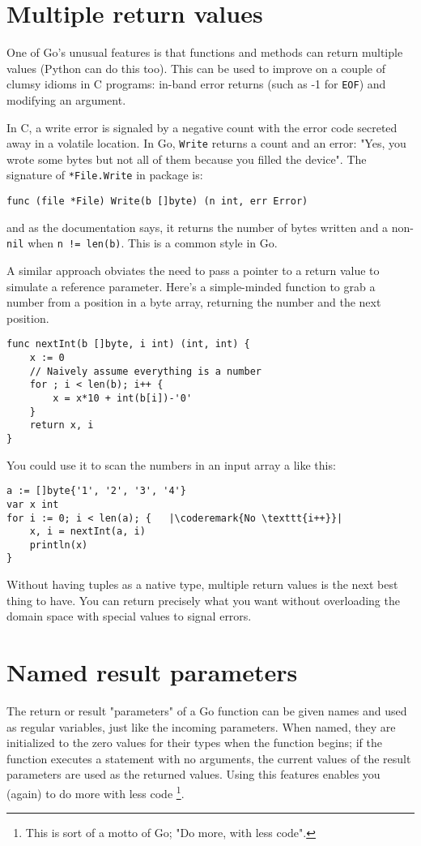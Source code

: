 

\section{Multiple return values}
\label{sec:multiple return}
One of Go's unusual features is that functions and methods can return multiple
values (Python can do this too). This can be used to improve on a couple of 
clumsy idioms in C programs:
in-band error returns (such as -1 for \texttt{EOF}) and modifying an argument.

In C, a write error is signaled by a negative count with the error code
secreted away in a volatile location. In Go, \lstinline{Write} returns a count and an
error: "Yes, you wrote some bytes but not all of them because you filled the
device". The signature of \lstinline{*File.Write} in package
 is:
\begin{lstlisting}
func (file *File) Write(b []byte) (n int, err Error)
\end{lstlisting}
and as the documentation says, it returns the number of bytes written and a
non-\lstinline{nil}  when \lstinline{n != len(b)}. This is a common
style in Go.

A similar approach obviates the need to pass a pointer to a return value to
simulate a reference parameter. Here's a simple-minded function to grab a
number from a position in a byte array, returning the number and the next
position.
\begin{lstlisting}
func nextInt(b []byte, i int) (int, int) {
    x := 0
    // Naively assume everything is a number
    for ; i < len(b); i++ {
        x = x*10 + int(b[i])-'0'
    }
    return x, i
}
\end{lstlisting}
You could use it to scan the numbers in an input array a like this:
\begin{lstlisting}
a := []byte{'1', '2', '3', '4'}
var x int
for i := 0; i < len(a); {	|\coderemark{No \texttt{i++}}|
    x, i = nextInt(a, i)
    println(x)
}
\end{lstlisting}
Without having tuples as a native type, multiple return values is the next
best thing to have. You can return precisely what you want without
overloading the domain space with special values to signal errors.

\section{Named result parameters}
\label{sec:named result parameters}
The return or result "parameters" of a Go function can be given names and used
as regular variables, just like the incoming parameters. When named, they are
initialized to the zero values for their types when the function begins; if the
function executes a  statement with no arguments, the current values of
the result parameters are used as the returned values. Using this
features enables you (again) to do more with less code \footnote{This is
sort of a motto of Go; "Do more, with less code".}.

